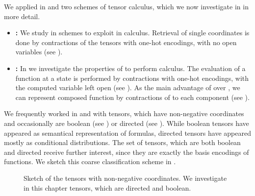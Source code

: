 
We applied in  and  two schemes of tensor calculus, which we now investigate in  in more detail.
\begin{itemize}
    \item \textbf{\CoordinateCalculus{}:} We study in  schemes to exploit \coordinateEncodings{} in calculus.
    Retrieval of single coordinates is done by contractions of the tensors with one-hot encodings, with no open variables (see ).
    \item \textbf{\BasisCalculus{}:} In  we investigate the properties of \basisEncodings{} to perform calculus.
    The evaluation of a function at a state is performed by contractions with one-hot encodings, with the computed variable left open (see ).
    As the main advantage of \basisEncodings{} over \coordinateEncodings{}, we can represent composed function by contractions of \basisEncodings{} to each component (see ).
\end{itemize}


We frequently worked in  and  with tensors, which have non-negative coordinates and occasionally are boolean (see ) or directed (see ).
While boolean tensors have appeared as semantical representation of formulas, directed tensors have appeared mostly as conditional distributions.
The set of tensors, which are both boolean and directed receive further interest, since they are exactly the basis encodings of functions.
We sketch this coarse classification scheme in .
\begin{figure}[t]
    \begin{center}
        
    \end{center}
    \caption{Sketch of the tensors with non-negative coordinates.
    We investigate in this chapter tensors, which are directed and boolean.}\label{fig:dbTensorSketch}
\end{figure}


